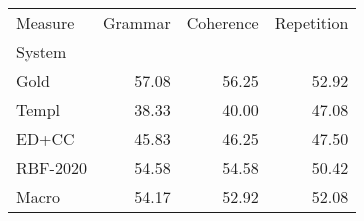 \begin{tabular}{lrrr}
\toprule
Measure & Grammar & Coherence & Repetition \\
System &  &  &  \\
\midrule
Gold & 57.08 & 56.25 & 52.92 \\
Templ & 38.33 & 40.00 & 47.08 \\
ED+CC & 45.83 & 46.25 & 47.50 \\
RBF-2020 & 54.58 & 54.58 & 50.42 \\
Macro & 54.17 & 52.92 & 52.08 \\
\bottomrule
\end{tabular}
